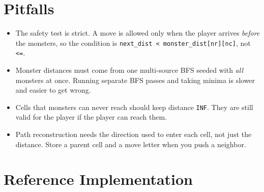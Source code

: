 \section{Pitfalls}

\begin{itemize}
\item The safety test is strict. A move is allowed only when the player arrives
\textit{before} the monsters, so the condition is
\texttt{next\_dist < monster\_dist[nr][nc]}, not \texttt{<=}.
\item Monster distances must come from one multi-source BFS seeded with
\textit{all} monsters at once. Running separate BFS passes and taking minima is
slower and easier to get wrong.
\item Cells that monsters can never reach should keep distance \texttt{INF}. They
are still valid for the player if the player can reach them.
\item Path reconstruction needs the direction used to enter each cell, not just
the distance. Store a parent cell and a move letter when you push a neighbor.
\end{itemize}

\section{Reference Implementation}

